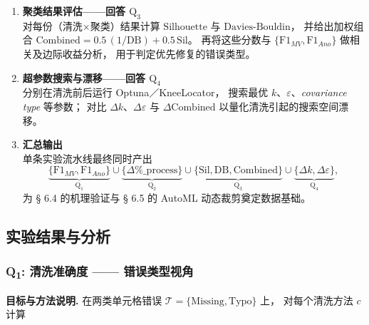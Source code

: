 \documentclass[10pt]{article} %
\numberwithin{equation}{section}
\begin{document}
\begin{enumerate}[label=\textbf{Step\,\arabic*.},itemindent=4em,leftmargin=0pt]
\item \textbf{聚类结果评估——回答 \(\mathrm{Q_3}\)}\\
      对每份（清洗×聚类）结果计算
      \(\mathrm{Silhouette}\) 与 \(\mathrm{Davies\text{-}Bouldin}\)，
      并给出加权组合
      \(\mathrm{Combined}=0.5\,(1/\mathrm{DB}) + 0.5\,\mathrm{Sil}\)。
      再将这些分数与
      \(\{\mathrm{F1}_{MV},\mathrm{F1}_{Ano}\}\) 做相关及边际收益分析，
      用于判定优先修复的错误类型。

\item \textbf{超参数搜索与漂移——回答 \(\mathrm{Q_4}\)}\\
      分别在清洗前后运行 Optuna／KneeLocator，
      搜索最优 \(k\)、\(\varepsilon\)、\textit{covariance type} 等参数；
      对比 \(\Delta k\)、\(\Delta\varepsilon\) 与
      \(\Delta\mathrm{Combined}\) 以量化清洗引起的搜索空间漂移。

\item \textbf{汇总输出}\\
      单条实验流水线最终同时产出  
      \[
        \underbrace{\bigl\{\mathrm{F1}_{MV},\mathrm{F1}_{Ano}\bigr\}}_{\mathrm{Q_1}}
        \cup
        \underbrace{\bigl\{\Delta\%\_{\text{process}}\bigr\}}_{\mathrm{Q_2}}
        \cup
        \underbrace{\bigl\{\mathrm{Sil},\mathrm{DB},\mathrm{Combined}\bigr\}}_{\mathrm{Q_3}}
        \cup
        \underbrace{\bigl\{\Delta k,\Delta\varepsilon\bigr\}}_{\mathrm{Q_4}},
      \]
      为 § 6.4 的机理验证与 § 6.5 的 AutoML 动态裁剪奠定数据基础。

\end{enumerate}

\subsection{实验结果与分析}
\label{sec:exp_results}

\subsubsection{Q\textsubscript{1}: 清洗准确度 —— 错误类型视角}
\label{sec:q1-accuracy}
\textbf{目标与方法说明.}  
在两类单元格错误  
\(\mathcal{T}=\{\mathrm{Missing},\mathrm{Typo}\}\) 上，  
对每个清洗方法 \(c\) 计算  

\vspace{-1em}
\end{document}
